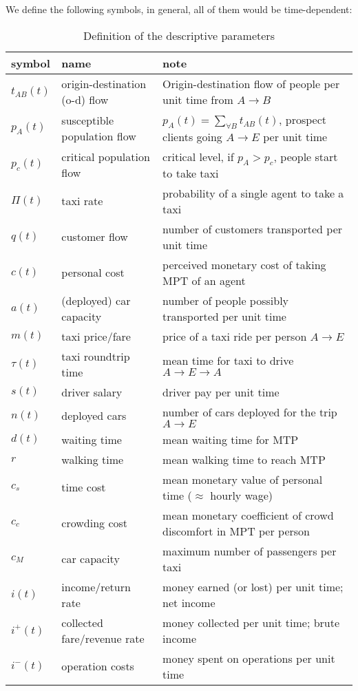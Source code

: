 \documentclass[a4paper]{report}
\newcommand\trip{$A\rightarrow{}E$}		%
\begin{document}
We define the following symbols, in general, all of them would be time-dependent:
\begin{table}[ht]
	\begin{tabular}{l p{} p{}}
	symbol		& 	name							& note\\\hline
	$t_{AB}(t)$	& 	origin-destination (o-d) flow				& Origin-destination flow of people per unit time from $A \rightarrow B$\\
	$p_A(t)$		&	susceptible population flow			& $p_A(t)=\sum\limits_{\forall B} t_{AB}(t)$, prospect clients going \trip{} per unit time\\
	$p_c(t)$		&	critical population flow				& critical level, if $p_A>p_c$, people start to take taxi\\
	$\Pi(t)$		& 	taxi rate							& probability of a single agent to take a taxi \\
	$q(t)$		& 	customer flow						& number of customers transported per unit time\\
	$c(t)$		&	personal cost						& perceived monetary cost of taking MPT of an agent\\
	$a(t)$		& 	(deployed) car capacity				& number of people possibly transported per unit time\\
	$m(t)$		&	taxi price/fare						& price of a taxi ride per person $A\rightarrow E$\\
	$\tau(t)$		& 	taxi roundtrip time					& mean time for taxi to drive $A\rightarrow E\rightarrow A$\\
	$s(t)$		& 	driver salary						& driver pay per unit time\\
	$n(t)$		&	deployed cars						& number of cars deployed for the trip $A\rightarrow E$\\
	$d(t)$		&	waiting time						& mean waiting time for MTP\\
	$r$			&	walking time						& mean walking time to reach MTP\\
	$c_s$		& 	time cost 							& mean monetary value of personal time ($\approx$ hourly wage)\\
	$c_c$		&	crowding cost						& mean monetary coefficient of crowd discomfort in MPT per person\\
	$c_M$		&	car capacity						& maximum number of passengers per taxi\\
	$i(t)$			&	income/return rate 					& money earned (or lost) per unit time; net income\\
	$i^{+}(t)$		&	collected fare/revenue rate			& money collected per unit time; brute income\\
	$i^{-}(t)$		& 	operation costs						& money spent on operations per unit time\\
\hline
	\end{tabular}
\caption{Definition of the descriptive parameters}%
\label{tab:descriptors}%
\end{table}%
\end{document}
